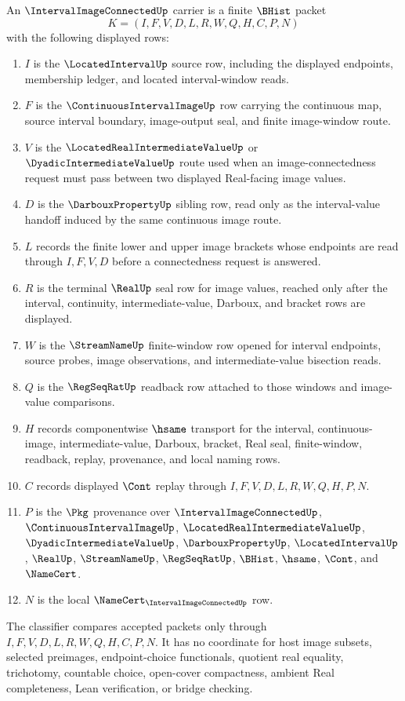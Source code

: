 \begin{definition}
\label{def:interval-image-connected-carrier}
An $\IntervalImageConnectedUp$ carrier is a finite $\BHist$ packet
$$
K=(I,F,V,D,L,R,W,Q,H,C,P,N)
$$
with the following displayed rows:
\begin{enumerate}
\item $I$ is the $\LocatedIntervalUp$ source row, including the displayed endpoints, membership ledger, and located interval-window reads.
\item $F$ is the $\ContinuousIntervalImageUp$ row carrying the continuous map, source interval boundary, image-output seal, and finite image-window route.
\item $V$ is the $\LocatedRealIntermediateValueUp$ or $\DyadicIntermediateValueUp$ route used when an image-connectedness request must pass between two displayed Real-facing image values.
\item $D$ is the $\DarbouxPropertyUp$ sibling row, read only as the interval-value handoff induced by the same continuous image route.
\item $L$ records the finite lower and upper image brackets whose endpoints are read through $I,F,V,D$ before a connectedness request is answered.
\item $R$ is the terminal $\RealUp$ seal row for image values, reached only after the interval, continuity, intermediate-value, Darboux, and bracket rows are displayed.
\item $W$ is the $\StreamNameUp$ finite-window row opened for interval endpoints, source probes, image observations, and intermediate-value bisection reads.
\item $Q$ is the $\RegSeqRatUp$ readback row attached to those windows and image-value comparisons.
\item $H$ records componentwise $\hsame$ transport for the interval, continuous-image, intermediate-value, Darboux, bracket, Real seal, finite-window, readback, replay, provenance, and local naming rows.
\item $C$ records displayed $\Cont$ replay through $I,F,V,D,L,R,W,Q,H,P,N$.
\item $P$ is the $\Pkg$ provenance over $\IntervalImageConnectedUp$, $\ContinuousIntervalImageUp$, $\LocatedRealIntermediateValueUp$, $\DyadicIntermediateValueUp$, $\DarbouxPropertyUp$, $\LocatedIntervalUp$, $\RealUp$, $\StreamNameUp$, $\RegSeqRatUp$, $\BHist$, $\hsame$, $\Cont$, and $\NameCert$.
\item $N$ is the local $\NameCert_{\IntervalImageConnectedUp}$ row.
\end{enumerate}
The classifier compares accepted packets only through $I,F,V,D,L,R,W,Q,H,C,P,N$. It has no coordinate for host image subsets, selected preimages, endpoint-choice functionals, quotient real equality, trichotomy, countable choice, open-cover compactness, ambient Real completeness, Lean verification, or bridge checking.
\end{definition}

